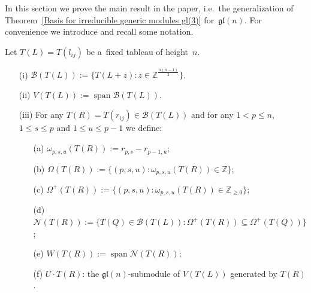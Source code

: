 \documentclass[pdftex]{sigma}
\DeclareMathOperator\Span{span} \DeclareMathOperator\Ker{Ker}
\numberwithin{equation}{section}
\begin{document}
In this section we prove the main result in the paper, i.e.~the generalization of Theorem~\ref{Basis for irreducible
generic modules gl(3)} for~$\mathfrak{gl}(n)$.
For convenience we introduce and recall some notation.

\begin{Notation}
\label{notation}
Let $T(L)=T(l_{ij})$ be a~f\/ixed tableau of height~$n$.
\begin{itemize}\itemsep=0pt
\item[(i)] $\mathcal{B}(T(L)):=\big\{T(L+z): z\in \mathbb{Z}^{\frac{n(n-1)}{2}}\big\}$.
\item[(ii)] $V(T(L)):= \Span \mathcal{B}(T(L))$.
\item[(iii)] For any $T(R)=T(r_{ij})\in \mathcal{B}(T(L))$ and for any $1<p\leq n$, $1\leq s\leq p$ and $1\leq u\leq
p-1$ we def\/ine:
\begin{itemize}\itemsep=0pt
\item[(a)] $\omega_{p,s,u}(T(R)):=r_{p,s}-r_{p-1,u}$;
\item[(b)] $\Omega(T(R)):=\{(p,s,u): \omega_{p,s,u}(T(R))\in \mathbb{Z}\}$;
\item[(c)] $\Omega^{+}(T(R)):=\{(p,s,u): \omega_{p,s,u}(T(R))\in \mathbb{Z}_{\geq 0}\}$;
\item[(d)] $\mathcal{N}(T(R)):=\{T(Q)\in \mathcal{B}(T(L)): \Omega^{+}(T(R))\subseteq \Omega^{+}(T(Q))\}$;
\item[(e)] $ W(T(R)):=\Span \mathcal{N}(T(R))$;
\item[(f)] $U\cdot T(R)$: the $\mathfrak{gl}(n)$-submodule of $V(T(L))$ generated by $T(R)$.
\end{itemize}
\end{itemize}
\end{Notation}
\end{document}
